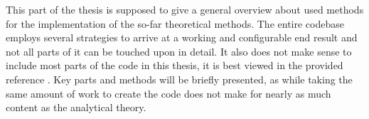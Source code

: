 This part of the thesis is supposed to give a general overview about used methods for the implementation of the so-far theoretical methods.
The entire codebase employs several strategies to arrive at a working and configurable end result and not all parts of it can be touched upon in detail.
It also does not make sense to include most parts of the code in this thesis, it is best viewed in the provided reference \cite{selfCode}.
Key parts and methods will be briefly presented, as while taking the same amount of work to create the code does not make for nearly as much content as the analytical theory.